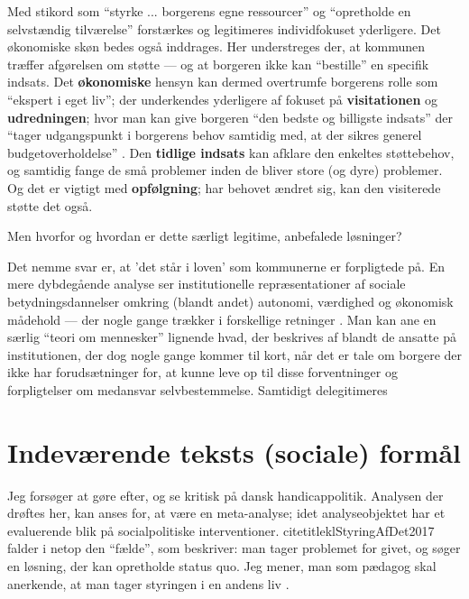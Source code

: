 Med stikord som “styrke ... borgerens egne ressourcer” og “opretholde en selvstændig tilværelse” forstærkes og legitimeres individfokuset yderligere.
Det økonomiske skøn bedes også inddrages. Her understreges der, at kommunen træffer afgørelsen om støtte — og at borgeren ikke kan “bestille” en specifik indsats.
Det \textbf{økonomiske} hensyn kan dermed overtrumfe borgerens rolle som “ekspert i eget liv”; der underkendes yderligere af fokuset på \textbf{visitationen} og \textbf{udredningen}; hvor man kan give borgeren “den bedste og billigste indsats” der “tager udgangspunkt i borgerens behov samtidig med, at der sikres generel budgetoverholdelse” .
Den \textbf{tidlige indsats} kan afklare den enkeltes støttebehov, og samtidig fange de små problemer inden de bliver store (og dyre) problemer.
Og det er vigtigt med \textbf{opfølgning}; har behovet ændret sig, kan den visiterede støtte det også.

Men hvorfor og hvordan er dette særligt legitime, anbefalede løsninger? 

Det nemme svar er, at 'det står i loven' som kommunerne er forpligtede på.
En mere dybdegående analyse ser institutionelle repræsentationer af sociale betydningsdannelser omkring (blandt andet) autonomi, værdighed og økonomisk mådehold --- der nogle gange trækker i forskellige retninger \autocite{moutsiosSocialeInstitutionerOg2016}.
Man kan ane en særlig “teori om mennesker” lignende hvad, der beskrives af \citeauthor{goffmanAsylumsEssaysSocial1991} blandt de ansatte på institutionen, der dog nogle gange kommer til kort, når det er tale om borgere der ikke har forudsætninger for, at kunne leve op til disse forventninger og forpligtelser om medansvar selvbestemmelse.
Samtidigt delegitimeres 

\section{Indeværende teksts (sociale) formål}
Jeg forsøger at gøre  efter, og se kritisk på dansk handicappolitik.
Analysen der drøftes her, kan anses for, at være en meta-analyse; idet analyseobjektet har et evaluerende blik på socialpolitiske interventioner.
citetitle{klStyringAfDet2017} falder i netop den “fælde”, som \citeauthor{scheurichPolicyArchaeologyNew1994} beskriver: man tager problemet for givet, og søger en løsning, der kan opretholde status quo.
Jeg mener, man som pædagog skal anerkende, at man tager styringen i en andens liv \autocite{andersenSocialWorkPower2018}.
